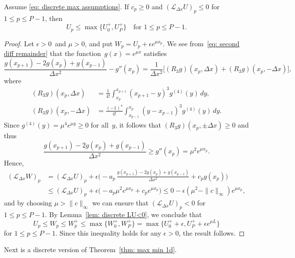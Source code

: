 \begin{theorem}\label{thm: discrete max principle}
Assume \eqref{eq: discrete max assumptions}.
If $c_p\ge0$ and $(\mathcal{L}_{\Delta x}U)_p\le0$ for $1\le p\le P-1$, then 
\[
U_p\le\max\{U_0^+,U_P^+\}\quad\text{for $1\le p\le P-1$.}
\]
\end{theorem}
\begin{proof}
Let $\epsilon>0$~and $\mu>0$, and put $W_p=U_p+\epsilon e^{\mu x_p}$.  
We see from~\eqref{eq: second diff remainder} that the 
function~$g(x)=e^{\mu x}$ satisfies
\[
\frac{g(x_{p+1})-2g(x_p)+g(x_{p-1})}{\Delta x^2}-g''(x_p)
	=\frac{1}{\Delta x^2}\bigl[(R_3g)(x_p,\Delta x)+(R_3g)(x_p,-\Delta x)\bigr],
\]
where
\begin{align*}
(R_3g)(x_p,\Delta x)
	&=\frac{1}{4!}\int_{x_p}^{x_{p+1}}(x_{p+1}-y)^3g^{(4)}(y)\,dy,\\
(R_3g)(x_p,-\Delta x)
	&=\frac{(-1)^4}{4!}\int_{x_{p-1}}^{x_p}(y-x_{p-1})^3g^{(4)}(y)\,dy.
\end{align*}
Since $g^{(4)}(y)=\mu^4e^{\mu y}\ge0$ for all~$y$, it follows that
$(R_3g)(x_p,\pm\Delta x)\ge0$ and thus
\[
\frac{g(x_{p+1})-2g(x_p)+g(x_{p-1})}{\Delta x^2}\ge g''(x_p)=\mu^2e^{\mu x_p}.
\]
Hence, 
\begin{align*}
(\mathcal{L}_{\Delta x}W)_p&=(\mathcal{L}_{\Delta x}U)_p
	+\epsilon\biggl(-a_p\,\frac{g(x_{p+1})-2g(x_p)+g(x_{p-1})}{\Delta x^2}
	+c_pg(x_p)\biggr)\\
	&\le (\mathcal{L}_{\Delta x}U)_p
		+\epsilon\bigl(-a_p\mu^2e^{\mu x_p}+c_pe^{\mu x_p}\bigr)
	\le0-\epsilon(\mu^2-\|c\|_\infty)e^{\mu x_p}, 
\end{align*}
and by choosing $\mu>\|c\|_\infty$ we can ensure that 
$(\mathcal{L}_{\Delta x}U)_p<0$ for~$1\le p\le P-1$.  By 
Lemma~\ref{lem: discrete LU<0}, we conclude that
\[
U_p\le W_p\le W_p^+\le\max\{W_0^+,W_P^+\}
	=\max\{U_0^++\epsilon,U_P^++\epsilon e^{\mu L}\}
\]
for $1\le p\le P-1$.  Since this inequality holds for any $\epsilon>0$, the 
result follows.
\end{proof}

Next is a discrete version of Theorem~\ref{thm: max min 1d}.

